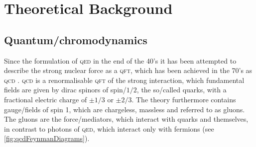 \documentclass[../../index.tex]{subfiles}
\begin{document}
\chapter{Theoretical Background}

\section{Quantum\-/chromodynamics}
\label{sec:quantumchromodynamics}
Since the formulation of \textsc{qed} in the end of the 40's it has been
attempted to describe the strong nuclear force as a \textsc{qft}, which has been
achieved in the 70's as \textsc{qcd}
\cite{GellMann1972,Fritzsch1973,Gross1973,Politzer1973,Weinberg1973}.
\textsc{qcd} is a renormalisable \textsc{qft} of the strong interaction, which
fundamental fields are given by dirac spinors of spin\-/$1/2$, the so\-/called
quarks, with a fractional electric charge of $\pm 1/3$ or $\pm 2/3$. The theory
furthermore contains gauge\-/fields of spin 1, which are chargeless, massless
and referred to as gluons. The gluons are the force\-/mediators, which interact
with quarks and themselves, in contrast to photons of \textsc{qed}, which
interact only with fermions (see \cref{fig:qcdFeynmanDiagrams}).
\end{document}
